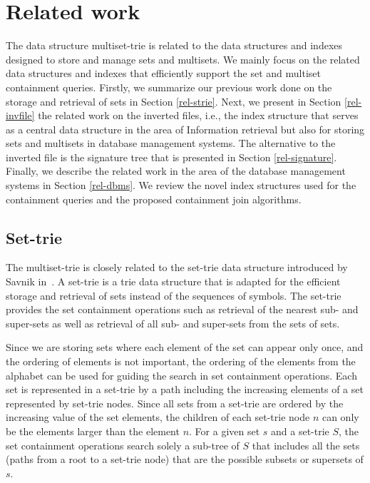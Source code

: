 \section{Related work} \label{c:relwork}

The data structure multiset-trie is related to the data structures and indexes designed to store and manage sets and multisets. We mainly focus on the related data structures and indexes that efficiently support the set and multiset containment queries. Firstly, we summarize our previous work done on the storage and retrieval of sets in Section \ref{rel-strie}. Next, we present in Section \ref{rel-invfile} the related work on the inverted files, i.e., the index structure that serves as a central data structure in the area of Information retrieval but also for storing sets and multisets in database management systems. The alternative to the inverted file is the signature tree that is presented in Section \ref{rel-signature}. Finally, we describe the related work in the area of the database management systems in Section \ref{rel-dbms}. We review the novel index structures used for the containment queries and the proposed containment join algorithms. 


\subsection{Set-trie\label{rel-strie}}

The multiset-trie is closely related to the set-trie data structure introduced by Savnik in~\cite{savnik2013index,savnik2021plos}. A set-trie is a trie data structure that is adapted for the efficient storage and retrieval of sets instead of the sequences of symbols. The set-trie provides the set containment operations such as retrieval of the nearest sub- and super-sets as well as retrieval of all sub- and super-sets from the sets of sets.

Since we are storing sets where each element of the set can appear only once, and the ordering of elements is not important, the ordering of the elements from the alphabet can be used for guiding the search in set containment operations. Each set is represented in a set-trie by a path including the increasing elements of a set represented by set-trie nodes. Since all sets from a set-trie are ordered by the increasing value of the set elements, the children of each set-trie node $n$ can only be the elements larger than the element $n$. For a given set $s$ and a set-trie $S$, the set containment operations search solely a sub-tree of $S$ that includes all the sets (paths from a root to a set-trie node) that are the possible subsets or supersets of $s$.

